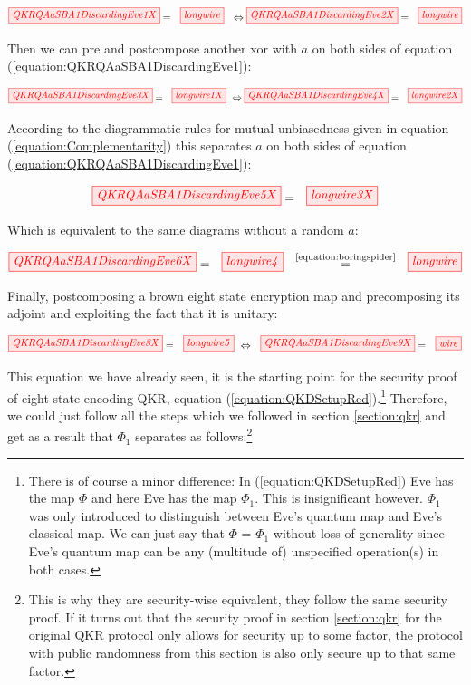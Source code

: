 \documentclass[]{article}
\newcommand{\equaltext}[1]{\ensuremath{\stackrel{\text{#1}}{=}}}
\begin{document}
\begin{equation}
\label{equation:QKRQAaSBA1DiscardingEve1}
\tikzfig{QKRQAaSBA1DiscardingEve1X} = ~~ \tikzfig{longwire}
~~\Leftrightarrow
\tikzfig{QKRQAaSBA1DiscardingEve2X} = ~~ \tikzfig{longwire}
\end{equation}

Then we can pre and postcompose another xor with $a$ on both sides of equation (\ref{equation:QKRQAaSBA1DiscardingEve1}):

\begin{equation}\\
\label{equation:QKRQAaSBA1DiscardingEve3}
\tikzfig{QKRQAaSBA1DiscardingEve3X} = ~~ \tikzfig{longwire1X} ~
\Leftrightarrow
\tikzfig{QKRQAaSBA1DiscardingEve4X} = ~~ \tikzfig{longwire2X}
\end{equation}

According to the diagrammatic rules for mutual unbiasedness given in equation (\ref{equation:Complementarity}) this separates $a$ on both sides of equation (\ref{equation:QKRQAaSBA1DiscardingEve1}):

\begin{equation}
\label{QKRQAaSBA1DiscardingEve5}
\tikzfig{QKRQAaSBA1DiscardingEve5X} = ~~ \tikzfig{longwire3X}
\end{equation}

Which is equivalent to the same diagrams without a random $a$:

\begin{equation}
\tikzfig{QKRQAaSBA1DiscardingEve6X} = ~~ \tikzfig{longwire4} ~~ \equaltext{\ref{equation:boringspider}} ~~ \tikzfig{longwire}
\end{equation}

Finally, postcomposing a brown eight state encryption map and precomposing its adjoint and exploiting the fact that it is unitary:

\begin{equation}
\tikzfig{QKRQAaSBA1DiscardingEve8X} = ~~ \tikzfig{longwire5} ~ \Leftrightarrow ~~ \tikzfig{QKRQAaSBA1DiscardingEve9X} = ~~ \tikzfig{wire}
\end{equation}


This equation we have already seen, it is the starting point for the security proof of eight state encoding QKR, equation (\ref{equation:QKDSetupRed}).\footnote{There is of course a minor difference: In (\ref{equation:QKDSetupRed}) Eve has the map $\Phi$ and here Eve has the map $\Phi_1$. This is insignificant however. $\Phi_1$ was only introduced to distinguish between Eve's quantum map and Eve's classical map. We can just say that $\Phi$ = $\Phi_1$ without loss of generality since Eve's quantum map can be any (multitude of) unspecified operation(s) in both cases.} Therefore, we could just follow all the steps which we followed in section \ref{section:qkr} and get as a result that $\Phi_1$ separates as follows:\footnote{This is why they are security-wise equivalent, they follow the same security proof. If it turns out that the security proof in section \ref{section:qkr} for the original QKR protocol only allows for security up to some factor, the protocol with public randomness from this section is also only secure up to that same factor.}
\end{document}
